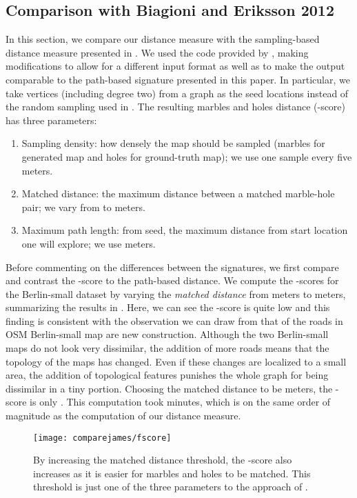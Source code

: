\subsection{Comparison with {Biagioni and Eriksson 2012}}
\label{subsec-comparejames}
In this section, we compare our distance measure with the sampling-based
distance measure presented in
.  We used the code provided
by , making
modifications to allow for a different input format as well as to make the
output comparable to the path-based signature presented in this
paper.  In particular, we take vertices (including degree
two) from a graph as the seed locations
instead of the random sampling used in \cite{Biagioni:2012:MIF:2424321.2424333}.
The resulting marbles and holes distance (-score) has three
parameters:
\begin{enumerate}
\item{ Sampling density: how densely the map should be sampled (marbles for
generated map and holes for ground-truth
    map); we use one sample every five meters.}
\item{ Matched distance: the maximum distance between a matched marble-hole
pair; we vary from  to  meters.}
\item{ Maximum path length: from seed, the maximum distance from start location
one will explore; we use  meters.}
\end{enumerate}

Before commenting on the differences between the signatures, we first compare
and contrast the -score to the path-based
distance.
We compute the -scores for the Berlin-small dataset by varying the {\em
matched distance} from  meters to  meters, summarizing the results in
.
Here, we can see the -score is quite low and this finding is
consistent with the observation we can draw from
 that  of the roads in OSM Berlin-small
map are new construction.
Although the two Berlin-small maps do not look very dissimilar,
the addition of more roads means that the topology of the maps has
changed.  Even if these changes are localized to a small area, the addition of
topological features punishes the whole graph for being dissimilar in a
tiny portion.  Choosing the matched distance to be  meters,
the -score is only  .
This computation took 
minutes, which is on the same order of magnitude as the
computation of our distance measure.



\begin{figure}[tbph]
\centering
\texttt{[image: comparejames/fscore]}
\caption{By increasing the matched distance threshold, the -score also
increases as it is easier for marbles and holes to be matched.  This
threshold is just one of the three parameters to the approach of
.}
\label{fig-fscore}
\end{figure}


